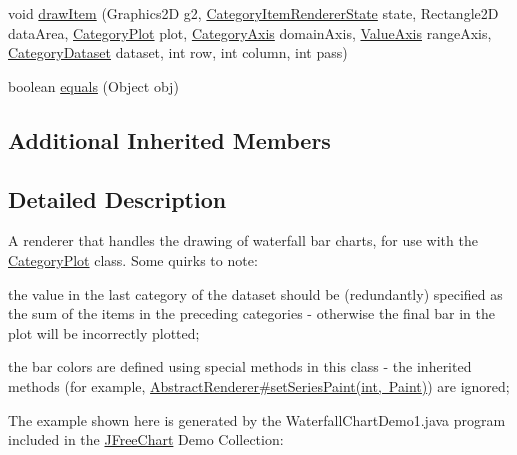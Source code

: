 \begin{DoxyCompactItemize}
\item 
void \mbox{\hyperlink{classorg_1_1jfree_1_1chart_1_1renderer_1_1category_1_1_waterfall_bar_renderer_ab2b054093e43965a6f62c2f06f0b3c3b}{draw\+Item}} (Graphics2D g2, \mbox{\hyperlink{classorg_1_1jfree_1_1chart_1_1renderer_1_1category_1_1_category_item_renderer_state}{Category\+Item\+Renderer\+State}} state, Rectangle2D data\+Area, \mbox{\hyperlink{classorg_1_1jfree_1_1chart_1_1plot_1_1_category_plot}{Category\+Plot}} plot, \mbox{\hyperlink{classorg_1_1jfree_1_1chart_1_1axis_1_1_category_axis}{Category\+Axis}} domain\+Axis, \mbox{\hyperlink{classorg_1_1jfree_1_1chart_1_1axis_1_1_value_axis}{Value\+Axis}} range\+Axis, \mbox{\hyperlink{interfaceorg_1_1jfree_1_1data_1_1category_1_1_category_dataset}{Category\+Dataset}} dataset, int row, int column, int pass)
\item 
boolean \mbox{\hyperlink{classorg_1_1jfree_1_1chart_1_1renderer_1_1category_1_1_waterfall_bar_renderer_acb16609af4d6e77f1fe5214f6ba54fc2}{equals}} (Object obj)
\end{DoxyCompactItemize}
\subsection*{Additional Inherited Members}


\subsection{Detailed Description}
A renderer that handles the drawing of waterfall bar charts, for use with the \mbox{\hyperlink{}{Category\+Plot}} class. Some quirks to note\+: 
\begin{DoxyItemize}
\item the value in the last category of the dataset should be (redundantly) specified as the sum of the items in the preceding categories -\/ otherwise the final bar in the plot will be incorrectly plotted; 
\item the bar colors are defined using special methods in this class -\/ the inherited methods (for example, \mbox{\hyperlink{classorg_1_1jfree_1_1chart_1_1renderer_1_1_abstract_renderer_a65149cab3fbc60f7e6b1b51fbd5a29ed}{Abstract\+Renderer\#set\+Series\+Paint(int, Paint)}}) are ignored; 
\end{DoxyItemize}The example shown here is generated by the {\ttfamily Waterfall\+Chart\+Demo1.\+java} program included in the \mbox{\hyperlink{classorg_1_1jfree_1_1chart_1_1_j_free_chart}{J\+Free\+Chart}} Demo Collection\+: ~\newline
~\newline
  

